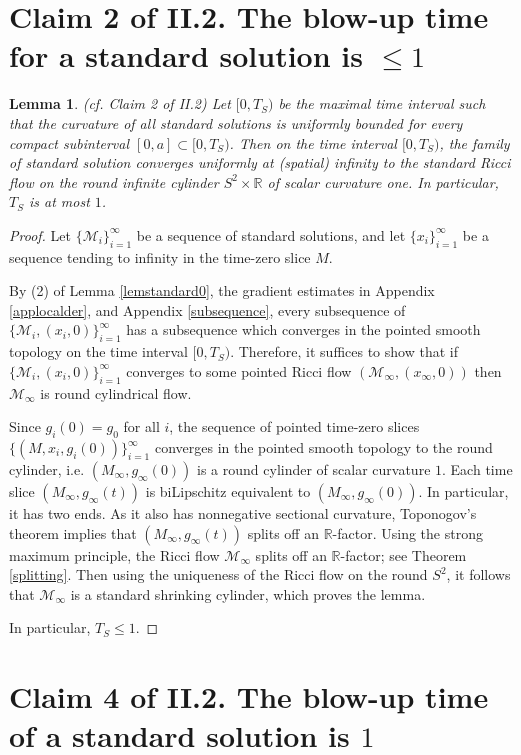 \documentclass[12pt]{amsart}
\newcommand{\M}{{\mathcal M}}
\newcommand{\R}{{\mathbb R}}
\numberwithin{equation}{section}
\theoremstyle{plain}
\newtheorem{lemma}[equation]{Lemma}
\theoremstyle{definition}
\theoremstyle{remark}
\begin{document}
\section{Claim 2 of II.2.
The blow-up time for a standard solution is $\leq 1$
} \label{claim2}

\begin{lemma} (cf. Claim 2 of II.2) \label{lemclaim2}
Let $[0,T_S)$ be the maximal time interval such that 
the curvature of all standard solutions is uniformly
bounded for every compact subinterval $[0,a]\subset [0,T_S)$.
Then on the time interval $[0,T_S)$, the family of standard solution converges 
uniformly at (spatial) infinity  to the standard Ricci flow 
on the round infinite cylinder $S^2\times \R$ of scalar curvature one.
In particular, $T_S$ is  at most $1$.
\end{lemma}
\begin{proof}
Let $\{\M_i\}_{i=1}^\infty$ be a sequence of standard solutions, and
let $\{x_i\}_{i=1}^\infty$ be a sequence tending to infinity
in the time-zero slice $M$.

By (2) of Lemma \ref{lemstandard0}, the gradient estimates in Appendix \ref{applocalder},
 and Appendix \ref{subsequence}, every subsequence
of $\{\M_i, (x_i,0)\}_{i=1}^\infty$ has a subsequence which
converges in the pointed smooth topology on the time interval $[0,T_S)$.
Therefore, it suffices to show that if $\{\M_i, (x_i,0)\}_{i=1}^\infty$
converges to some pointed Ricci flow
$(\M_\infty, (x_\infty, 0))$ then 
$\M_\infty$ is round cylindrical flow.


Since $g_i(0)=g_0$ for all $i$,  the sequence of pointed time-zero slices
$\{(M,x_i, g_i(0))\}_{i=1}^\infty$ converges in the pointed smooth topology
to the round cylinder, i.e. $(M_\infty,g_\infty(0))$ is a round cylinder
of scalar curvature $1$. Each time slice $(M_\infty,g_\infty(t))$
is biLipschitz equivalent to $(M_\infty,g_\infty(0))$. In particular,
it has two ends. As it also has nonnegative sectional curvature,
Toponogov's theorem implies that $(M_\infty,g_\infty(t))$ splits off
an $\R$-factor. Using the strong maximum principle, 
the Ricci flow $\M_\infty$ splits off an $\R$-factor;
see Theorem \ref{splitting}.
Then using the uniqueness of the Ricci flow on the round $S^2$, it
follows that $\M_\infty$ is a standard shrinking cylinder, which proves the lemma.

In particular, $T_S\leq 1$. 
\end{proof}

\section{Claim 4 of II.2. 
The blow-up time of a standard solution is $1$}
\label{secclaim4}
\end{document}

